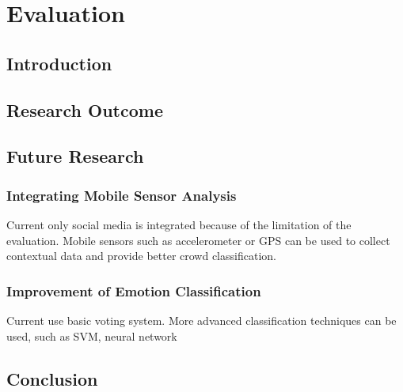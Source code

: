 \chapter{Evaluation}

\ifpdf
    \graphicspath{{Chapter6/Figs/Raster/}{Chapter6/Figs/PDF/}{Chapter6/Figs/}}
\else
    \graphicspath{{Chapter6/Figs/Vector/}{Chapter6/Figs/}}
\fi

\section{Introduction}
\section{Research Outcome}
\section{Future Research}
\subsection{Integrating Mobile Sensor Analysis}
Current only social media is integrated because of the limitation of the evaluation. Mobile sensors such as accelerometer or GPS can be used to collect contextual data and provide better crowd classification.

\subsection{Improvement of Emotion Classification}
Current use basic voting system. More advanced classification techniques can be used, such as SVM, neural network
\section{Conclusion}